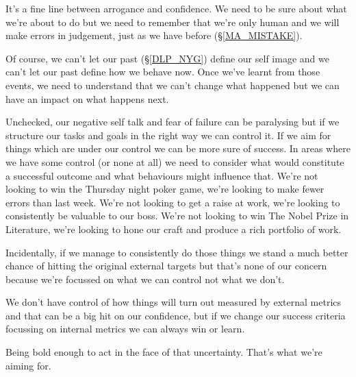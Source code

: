 \cleardoublepage
{\small
It's a fine line between arrogance and confidence. We need to be sure about what we're about to do but we need to remember that we're only human and we will make errors in judgement, just as we have before (\S \ref{MA_MISTAKE}). 

Of course, we can't let our past (\S \ref{DLP_NYG}) define our self image and we can't let our past define how we behave now. Once we've learnt from those events, we need to understand that we can't change what happened but we can have an impact on what happens next.

Unchecked, our negative self talk and fear of failure can be paralysing but if we structure our tasks and goals in the right way we can control it. If we aim for things which are under our control we can be more sure of success. In areas where we have some control (or none at all) we need to consider what would constitute a successful outcome and what behaviours might influence that. We're not looking to win the Thursday night poker game, we're looking to make fewer errors than last week. We're not looking to get a raise at work, we're looking to consistently be valuable to our boss. We're not looking to win The Nobel Prize in Literature, we're looking to hone our craft and produce a rich portfolio of work.

Incidentally, if we manage to consistently do those things we stand a much better chance of hitting the original external targets but that's none of our concern because we're focussed on what we can control not what we don't.

We don't have control of how things will turn out measured by external metrics and that can be a big hit on our confidence, but if we change our success criteria focussing on internal metrics we can always win or learn. 

Being bold enough to act in the face of that uncertainty. That's what we're aiming for.

}

